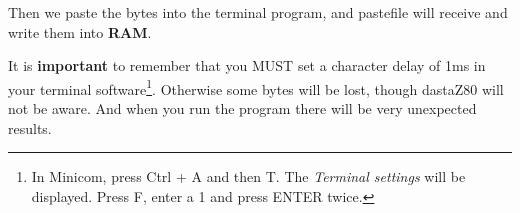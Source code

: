     Then we paste the bytes into the terminal program, and pastefile will
    receive and write them into \textbf{RAM}.

    It is \textbf{important} to remember that you MUST set a character delay of
    1ms in your terminal software\footnote{In Minicom, press Ctrl + A and then
    T. The \textit{Terminal settings} will be displayed. Press F, enter a 1 and
    press ENTER twice.}. Otherwise some bytes will be lost, though
    dastaZ80 will not be aware. And when you run the program there will be very
    unexpected results.






